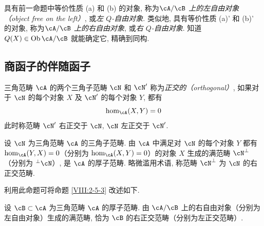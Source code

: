 \begin{definition}\label{VIII:2-5-4}
具有前一命题中等价性质 (a) 和 (b) 的对象, 称为\emph{$\cA/\cB$ 上的左自由对象（object free on the left）}, 或\emph{左 $Q$-自由对象}. 类似地, 具有等价性质 (a)' 和 (b)' 的对象, 称为\emph{$\cA/\cB$ 上的右自由对象}, 或\emph{右 $Q$-自由对象}. 知道 $Q(X)\in\operatorname{Ob}{\cA/\cB}$ 就能确定它, 精确到同构.
\end{definition}

\subsection{商函子的伴随函子}\label{VIII:2-6}

\begin{definition}\label{VIII:2-6-1}
三角范畴 $\cA$ 的两个三角子范畴 $\cN$ 和 $\cN'$ 称为\emph{正交的（orthogonal）}, 如果对于 $\cN$ 的每个对象 $X$ 及 $\cN'$ 的每个对象 $Y$, 都有
\[
  \hom_\cA(X,Y) = 0
\]
此时称范畴 $\cN'$ 右正交于 $\cN$, $\cN$ 左正交于 $\cN'$.
\end{definition}

\begin{proposition}\label{VIII:2-6-2}
设 $\cN$ 为三角范畴 $\cA$ 的三角子范畴. 由 $\cA$ 中满足对 $\cN$ 的每个对象 $Y$ 都有 $\hom_\cA(Y,X)=0$（分别为 $\hom_\cA(X,Y)=0$）的对象 $X$ 生成的满范畴 $\cN^\bot$（分别为 $^\bot\cN$）, 是 $\cA$ 的厚子范畴. 略微滥用术语, 称范畴 $\cN^\bot$ 为 $\cN$ 的右正交范畴.
\end{proposition}

利用此命题可将命题 \ref{VIII:2-5-3} 改述如下.

\begin{proposition}\label{VIII:2-6-3}
设 $\cB\subset\cA$ 为三角范畴 $\cA$ 的厚子范畴. 由 $\cA/\cB$ 上的右自由对象（分别为左自由对象）生成的满范畴, 恰为 $\cB$ 的右正交范畴（分别为左正交范畴）.
\end{proposition}

